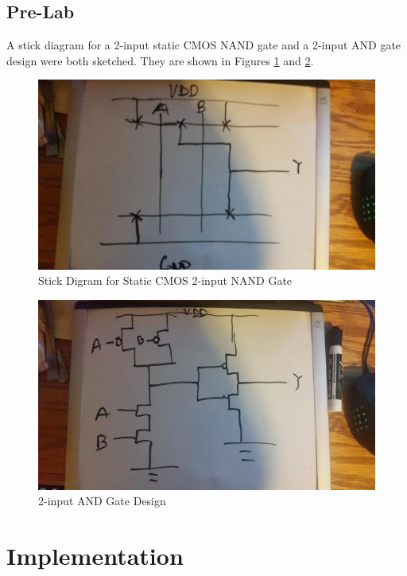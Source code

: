 \documentclass[12pt]{article}
\begin{document}
\subsection{Pre-Lab}
A stick diagram for a 2-input static CMOS NAND gate and a 2-input AND gate design were both sketched. They are shown in Figures \ref{fig:prelab-stick} and \ref{fig:prelab-design}.
\begin{figure}[H]
\centering
\includegraphics[width=0.7\linewidth]{prelab-stick}
\caption{Stick Digram for Static CMOS 2-input NAND Gate}
\label{fig:prelab-stick}
\end{figure}

\begin{figure}[H]
\centering
\includegraphics[width=0.7\linewidth]{prelab-design}
\caption{2-input AND Gate Design}
\label{fig:prelab-design}
\end{figure}

\section{Implementation}
\end{document}
